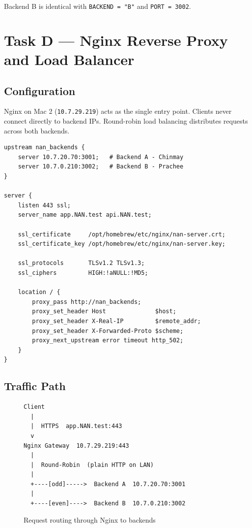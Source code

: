 \documentclass[12pt,a4paper]{article}
\begin{document}
Backend B is identical with \texttt{BACKEND = "B"} and \texttt{PORT = 3002}.

\section{Task D --- Nginx Reverse Proxy and Load Balancer}

\subsection{Configuration}

Nginx on Mac 2 (\texttt{10.7.29.219}) acts as the single entry point. Clients never connect directly to backend IPs. Round-robin load balancing distributes requests across both backends.

\begin{lstlisting}[caption=nginx/nan.conf (abridged)]
upstream nan_backends {
    server 10.7.20.70:3001;   # Backend A - Chinmay
    server 10.7.0.210:3002;   # Backend B - Prachee
}

server {
    listen 443 ssl;
    server_name app.NAN.test api.NAN.test;

    ssl_certificate     /opt/homebrew/etc/nginx/nan-server.crt;
    ssl_certificate_key /opt/homebrew/etc/nginx/nan-server.key;

    ssl_protocols       TLSv1.2 TLSv1.3;
    ssl_ciphers         HIGH:!aNULL:!MD5;

    location / {
        proxy_pass http://nan_backends;
        proxy_set_header Host              $host;
        proxy_set_header X-Real-IP         $remote_addr;
        proxy_set_header X-Forwarded-Proto $scheme;
        proxy_next_upstream error timeout http_502;
    }
}
\end{lstlisting}

\subsection{Traffic Path}

\begin{figure}[h!]
\centering
\begin{mdframed}[backgroundcolor=codebg,linecolor=borderblue]
\begin{verbatim}
Client
  |
  |  HTTPS  app.NAN.test:443
  v
Nginx Gateway  10.7.29.219:443
  |
  |  Round-Robin  (plain HTTP on LAN)
  |
  +----[odd]----->  Backend A  10.7.20.70:3001
  |
  +----[even]---->  Backend B  10.7.0.210:3002
\end{verbatim}
\end{mdframed}
\caption{Request routing through Nginx to backends}
\end{figure}
\end{document}
